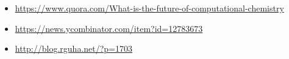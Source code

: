 \begin{itemize}
	\item \href{https://www.quora.com/What-is-the-future-of-computational-chemistry}{https://www.quora.com/What-is-the-future-of-computational-chemistry}

	\item \href{https://news.ycombinator.com/item?id=12783673}{https://news.ycombinator.com/item?id=12783673}

	\item \href{http://blog.rguha.net/?p=1703}{http://blog.rguha.net/?p=1703}
\end{itemize}
